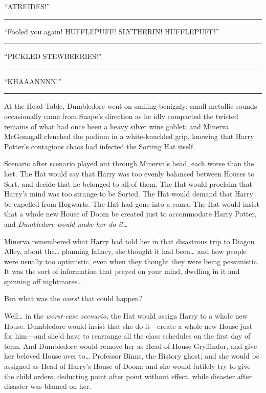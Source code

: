 ``ATREIDES!''

\begin{center}\rule{3in}{0.4pt}\end{center}

``Fooled you again! HUFFLEPUFF! SLYTHERIN! HUFFLEPUFF!''

\begin{center}\rule{3in}{0.4pt}\end{center}

``PICKLED STEWBERRIES!''

\begin{center}\rule{3in}{0.4pt}\end{center}

``KHAAANNNN!''

\begin{center}\rule{3in}{0.4pt}\end{center}

At the Head Table, Dumbledore went on smiling benignly; small metallic
sounds occasionally came from Snape's direction as he idly compacted the
twisted remains of what had once been a heavy silver wine goblet; and
Minerva McGonagall clenched the podium in a white-knuckled grip, knowing
that Harry Potter's contagious chaos had infected the Sorting Hat
itself.

Scenario after scenario played out through Minerva's head, each worse
than the last. The Hat would say that Harry was too evenly balanced
between Houses to Sort, and decide that he belonged to all of them. The
Hat would proclaim that Harry's mind was too strange to be Sorted. The
Hat would demand that Harry be expelled from Hogwarts. The Hat had gone
into a coma. The Hat would insist that a whole new House of Doom be
created just to accommodate Harry Potter, and \emph{Dumbledore would
make her do it\ldots{}}

Minerva remembered what Harry had told her in that disastrous trip to
Diagon Alley, about the\ldots{} planning fallacy, she thought it had
been\ldots{} and how people were usually too optimistic, even when they
thought they were being pessimistic. It was the sort of information that
preyed on your mind, dwelling in it and spinning off nightmares\ldots{}

But what was the \emph{worst} that could happen?

Well\ldots{} in the \emph{worst-case scenario,} the Hat would assign
Harry to a whole new House. Dumbledore would insist that she do
it---create a whole new House just for him---and she'd have to rearrange
all the class schedules on the first day of term. And Dumbledore would
remove her as Head of House Gryffindor, and give her beloved House over
to\ldots{} Professor Binns, the History ghost; and she would be assigned
as Head of Harry's House of Doom; and she would futilely try to give the
child orders, deducting point after point without effect, while disaster
after disaster was blamed on her.

